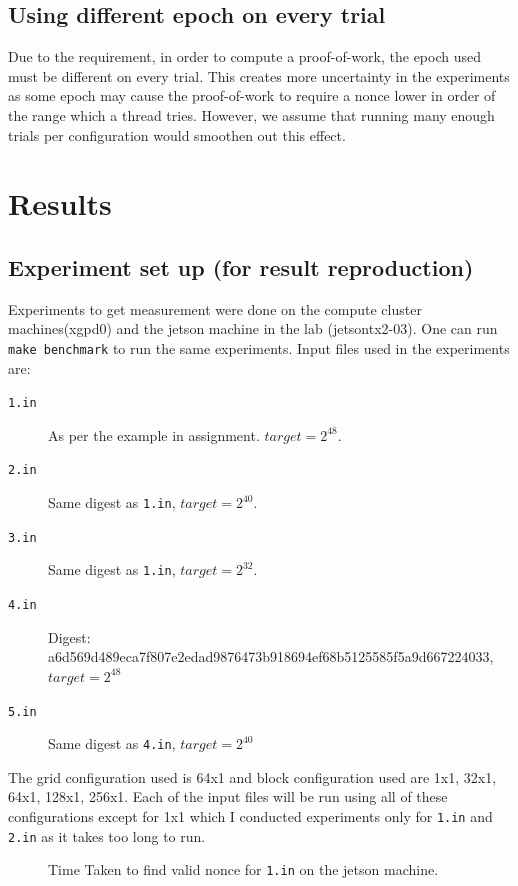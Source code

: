 \documentclass[a4paper]{article}
\begin{document}
\subsection{Using different epoch on every trial}
Due to the requirement, in order to compute a proof-of-work, the epoch used must be different on every trial. This creates more uncertainty in the experiments as some epoch may cause the proof-of-work to require a nonce lower in order of the range which a thread tries. However, we assume that running many enough trials per configuration would smoothen out this effect.

\section{Results}
\subsection{Experiment set up (for result reproduction)}
Experiments to get measurement were done on the compute cluster machines(xgpd0) and the jetson machine in the lab (jetsontx2-03). One can run \texttt{make benchmark} to run the same experiments. Input files used in the experiments are:
\begin{description}
    \item[{\texttt{1.in}}] As per the example in assignment. $target = 2^{48}$.
    \item[{\texttt{2.in}}] Same digest as \texttt{1.in}, $target = 2^{40}$.
    \item[{\texttt{3.in}}] Same digest as \texttt{1.in}, $target = 2^{32}$.
    \item[{\texttt{4.in}}] Digest: a6d569d489eca7f807e2edad9876473b918694ef68b5125585f5a9d667224033, $target = 2^{48}$
    \item[{\texttt{5.in}}] Same digest as \texttt{4.in}, $target = 2^{40}$
\end{description}
The grid configuration used is 64x1 and block configuration used are 1x1, 32x1, 64x1, 128x1, 256x1. Each of the input files will be run using all of these configurations except for 1x1 which I conducted experiments only for \texttt{1.in} and \texttt{2.in} as it takes too long to run. 

\begin{figure}
\caption{\label{fig:jetson1} Time Taken to find valid nonce for \texttt{1.in} on the jetson machine.}
\end{figure}
\end{document}
